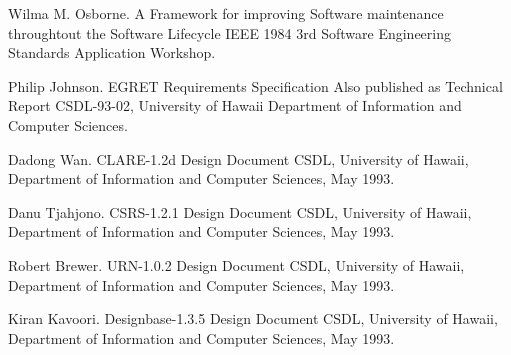 \begin{thebibliography}{}

Wilma M. Osborne.
\newblock A Framework for improving
  Software maintenance throughtout the Software Lifecycle IEEE 1984
  3rd Software Engineering Standards Application Workshop.

Philip Johnson.
\newblock EGRET  Requirements Specification
\newblock Also published as Technical Report CSDL-93-02, University of Hawaii
  Department of Information and Computer Sciences.


Dadong Wan.
\newblock CLARE-1.2d Design Document
\newblock CSDL, University of Hawaii, Department of
  Information and Computer Sciences, May 1993.

 Danu Tjahjono.
\newblock  CSRS-1.2.1 Design Document
\newblock CSDL, University of Hawaii, Department of
  Information and Computer Sciences, May 1993.

Robert Brewer.
\newblock  URN-1.0.2 Design Document
\newblock CSDL, University of Hawaii, Department of
  Information and Computer Sciences, May 1993.

Kiran Kavoori.
\newblock  Designbase-1.3.5 Design Document
\newblock CSDL, University of Hawaii, Department of
  Information and Computer Sciences, May 1993.

\end{thebibliography}








